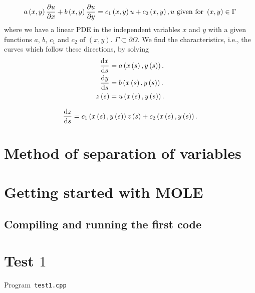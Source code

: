 \begin{equation*}
	a\left(x,y\right)\diffp{u}{x}+
	b\left(x,y\right)\diffp{u}{y}=
	c_{1}\left(x,y\right)u+
	c_{2}\left(x,y\right),
	u\text{ given for }\left(x,y\right)\in\Gamma
\end{equation*}
where we have a linear PDE in the independent variables $x$ and $y$
with a given functions $a$, $b$, $c_{1}$ and $c_{2}$ of $\left(x,y\right)$.
$\Gamma\subset\partial\Omega$.
We find the characteristics, i.e., the curves which follow these directions, by solving
\begin{align*}
	\diff{x}{s}     & =
	a\left(x\left(s\right),y\left(s\right)\right). \\
	\diff{y}{s}     & =
	b\left(x\left(s\right),y\left(s\right)\right). \\
	z\left(s\right) & =
	u\left(x\left(s\right),y\left(s\right)\right).
\end{align*}

\begin{equation*}
	\diff{z}{s}=
	c_{1}\left(x\left(s\right),y\left(s\right)\right)
	z\left(s\right)+
	c_{2}\left(x\left(s\right),y\left(s\right)\right).
\end{equation*}

\section{Method of separation of variables}


\section{Getting started with MOLE}
\subsection{Compiling and running the first code}

\section{Test $1$}

\begin{listing}[ht!]
	\tiny
	\centering
	\caption{Program~\texttt{test1.cpp}}
	\label{code:test1.cpp}
\end{listing}


